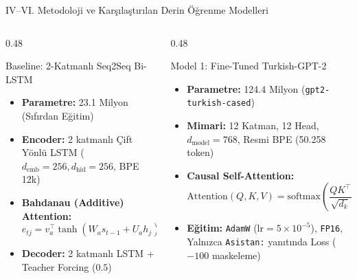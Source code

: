 \documentclass[aspectratio=169,10pt]{beamer}
\begin{document}
\begin{frame}{IV--VI. Metodoloji ve Karşılaştırılan Derin Öğrenme Modelleri}
    \begin{columns}[T]
        \begin{column}{0.48\textwidth}
            \begin{block}{Baseline: 2-Katmanlı Seq2Seq Bi-LSTM}
                \begin{itemize}
                    \item \textbf{Parametre:} 23.1 Milyon (Sıfırdan Eğitim)
                    \item \textbf{Encoder:} 2 katmanlı Çift Yönlü LSTM ($d_{\text{emb}}=256, d_{\text{hid}}=256$, BPE 12k)
                    \item \textbf{Bahdanau (Additive) Attention:}
                    \[
                        e_{tj} = v_a^\top \tanh(W_a s_{t-1} + U_a h_j)
                    \]
                    \item \textbf{Decoder:} 2 katmanlı LSTM + Teacher Forcing ($0.5$)
                \end{itemize}
            \end{block}
        \end{column}
        \begin{column}{0.48\textwidth}
            \begin{block}{Model 1: Fine-Tuned Turkish-GPT-2}
                \begin{itemize}
                    \item \textbf{Parametre:} 124.4 Milyon (\texttt{gpt2-turkish-cased})
                    \item \textbf{Mimari:} 12 Katman, 12 Head, $d_{\text{model}}=768$, Resmi BPE (50.258 token)
                    \item \textbf{Causal Self-Attention:}
                    \[
                        \text{Attention}(Q,K,V) = \text{softmax}\!\left(\frac{QK^\top}{\sqrt{d_k}} + M\right)\!V
                    \]
                    \item \textbf{Eğitim:} \texttt{AdamW} ($\text{lr}=5\times10^{-5}$), \texttt{FP16}, Yalnızca \texttt{Asistan:} yanıtında Loss ($-100$ maskeleme)
                \end{itemize}
            \end{block}
        \end{column}
    \end{columns}
\end{frame}
\end{document}
